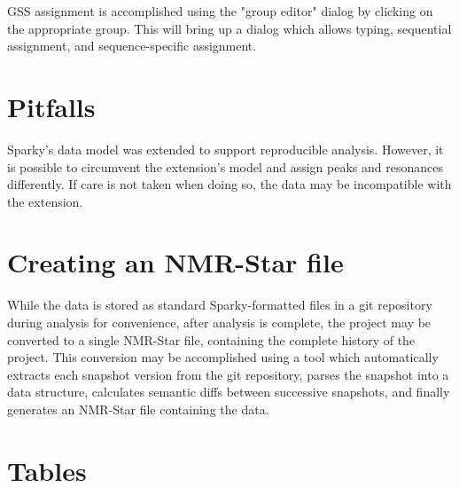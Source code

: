 GSS assignment is accomplished using the "group editor" dialog by clicking on
the appropriate group.  This will bring up a dialog which allows typing,
sequential assignment, and sequence-specific assignment.



\section{Pitfalls}
Sparky's data model was extended to support reproducible analysis.
However, it is possible to circumvent the extension's model and assign peaks
and resonances differently. If care is not taken when doing so, the data
may be incompatible with the extension.

\section{Creating an NMR-Star file}
While the data is stored as standard Sparky-formatted files in a git repository
during analysis for convenience, after analysis is complete, the project
may be converted to a single NMR-Star file, containing the complete history
of the project.  This conversion may be accomplished using a tool which
automatically extracts each snapshot version from the git repository, 
parses the snapshot into a data structure,
calculates semantic diffs between successive snapshots, 
and finally generates an NMR-Star file containing the data.

 

\clearpage
\section{Tables}


